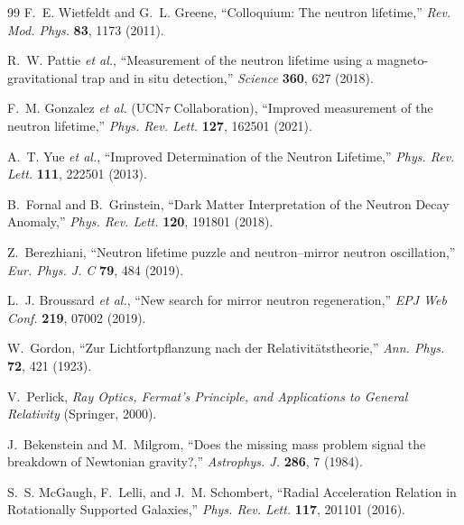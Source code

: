 \documentclass[aps,prb,twocolumn,superscriptaddress,floatfix,nofootinbib,longbibliography]{revtex4-2}
\begin{document}
\begin{thebibliography}{99}
F.~E. Wietfeldt and G.~L. Greene, ``Colloquium: The neutron lifetime,''
\textit{Rev. Mod. Phys.} \textbf{83}, 1173 (2011).

R.~W. Pattie \textit{et al.}, ``Measurement of the neutron lifetime using a
magneto-gravitational trap and in situ detection,'' \textit{Science}
\textbf{360}, 627 (2018).

F.~M. Gonzalez \textit{et al.} (UCN$\tau$ Collaboration), ``Improved
measurement of the neutron lifetime,'' \textit{Phys. Rev. Lett.}
\textbf{127}, 162501 (2021).

A.~T. Yue \textit{et al.}, ``Improved Determination of the Neutron
Lifetime,'' \textit{Phys. Rev. Lett.} \textbf{111}, 222501 (2013).

B.~Fornal and B.~Grinstein, ``Dark Matter Interpretation of the Neutron
Decay Anomaly,'' \textit{Phys. Rev. Lett.} \textbf{120}, 191801 (2018).

Z.~Berezhiani, ``Neutron lifetime puzzle and neutron--mirror neutron
oscillation,'' \textit{Eur. Phys. J. C} \textbf{79}, 484 (2019).

L.~J. Broussard \textit{et al.}, ``New search for mirror neutron
regeneration,'' \textit{EPJ Web Conf.} \textbf{219}, 07002 (2019).

W.~Gordon, ``Zur Lichtfortpflanzung nach der Relativit\"atstheorie,''
\textit{Ann. Phys.} \textbf{72}, 421 (1923).

V.~Perlick, \textit{Ray Optics, Fermat's Principle, and Applications to
General Relativity} (Springer, 2000).

J.~Bekenstein and M.~Milgrom, ``Does the missing mass problem signal the
breakdown of Newtonian gravity?,'' \textit{Astrophys. J.} \textbf{286},
7 (1984).

S.~S. McGaugh, F.~Lelli, and J.~M. Schombert, ``Radial Acceleration
Relation in Rotationally Supported Galaxies,'' \textit{Phys. Rev. Lett.}
\textbf{117}, 201101 (2016).

\end{thebibliography}
\end{document}
